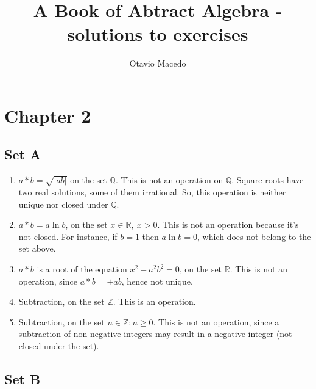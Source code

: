 \documentclass{article}
\author{Otavio Macedo}
\title{A Book of Abtract Algebra - solutions to exercises}
\begin{document}
\maketitle

\tableofcontents

\section{Chapter 2}
\subsection{Set A}
\begin{enumerate}
\item $a * b = \sqrt{|ab|}$ on the set $\mathbb{Q}$. This is not an operation on $\mathbb{Q}$. Square roots have two real solutions, some of them irrational. So, this operation is neither unique nor closed under $\mathbb{Q}$.

\item $a * b = a \ln b$, on the set ${x \in \mathbb{R}},\ x > 0$. This is not an operation because it's not closed. For instance, if $b = 1$ then $a\ln b = 0$, which does not belong to the set above.

\item $a * b$ is a root of the equation $x^2 - a^2b^2 = 0$, on the set $\mathbb{R}$. This is not an operation, since $a * b = \pm ab$, hence not unique.

\item Subtraction, on the set $\mathbb{Z}$. This is an operation.

\item Subtraction, on the set ${n \in \mathbb{Z} : n \geq 0}$. This is not an operation, since a subtraction of non-negative integers may result in a negative integer (not closed under the set).

\end{enumerate}

\subsection{Set B}
\end{document}
